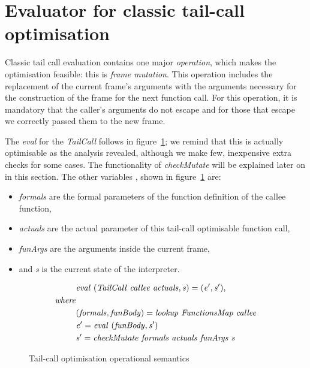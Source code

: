 \documentclass[diploma]{softlab-thesis}
\begin{document}
\section {Evaluator for classic tail-call optimisation}
\label{sec:classic-tco-eval}

Classic tail call evaluation contains one major \textit{operation}, which makes the optimisation 
feasible: this is \textit{frame mutation}. This operation includes the replacement of the current frame's arguments 
with the arguments necessary for the construction of the frame for the next function call. For this operation,
it is mandatory that the caller's arguments do not escape and for those that escape we correctly passed them 
to the new frame. 

The \textit{eval} for the \textit{TailCall} follows in figure~\ref{fig:tco}; we remind that this is actually optimisable as the analysis 
revealed, although we make few, inexpensive extra checks for some cases.
The functionality of \textit{checkMutate} will be explained later on in this section. The other variables 
, shown in figure~\ref{fig:tco} are:
\begin{itemize}
  \item \textit{formals} are the formal parameters of the function definition of the callee function,
  \item \textit{actuals} are the actual parameter of this tail-call optimisable function call,
  \item \textit{funArgs} are the arguments inside the current frame, 
  \item and \textit{s} is the current state of the interpreter.
\end{itemize}


\begin{figure}[h]
  \begin{align*}
    & \mathit{eval \hfill\ (TailCall \hfill\ callee \hfill\ actuals, s) = (e', s'),} \\
    \mathit{where} \\
    & \mathit{(formals, funBody) = lookup \hfill\ FunctionsMap \hfill\ callee} \\
    & \mathit{e' = eval \hfill\ (funBody, s')} \\
    & \mathit{s' = checkMutate \hfill\ formals \hfill\ actuals \hfill\ funArgs \hfill\ s} 
  \end{align*}
\caption{Tail-call optimisation operational semantics \label{fig:tco}}
\end{figure}
\end{document}
